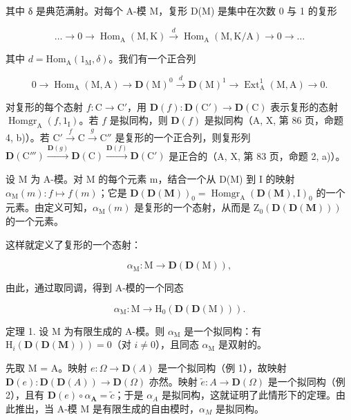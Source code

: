 其中 δ 是典范满射。对每个 A-模 M，复形 D(M) 是集中在次数 0 与 1 的复形

\[
\dots \longrightarrow 0 \longrightarrow \operatorname{Hom} _ {\mathrm{A}} (\mathrm{M}, \mathrm{K}) \stackrel {d} {\longrightarrow} \operatorname{Hom} _ {\mathrm{A}} (\mathrm{M}, \mathrm{K} / \mathrm{A}) \longrightarrow 0 \longrightarrow \dots
\]

其中 \(d = \mathrm{Hom}_{\mathrm{A}}(1_{\mathrm{M}},\delta)\)。我们有一个正合列

\[
0 \to \operatorname{Hom} _ {\mathrm{A}} (\mathrm{M}, \mathrm{A}) \longrightarrow \mathbf {D} (\mathrm{M}) ^ {0} \stackrel {d} {\longrightarrow} \mathbf {D} (\mathrm{M}) ^ {1} \longrightarrow \operatorname{Ext} _ {\mathrm{A}} ^ {1} (\mathrm{M}, \mathrm{A}) \to 0.
\]

对复形的每个态射 \(f: \mathrm{C} \to \mathrm{C}'\)，用 \(\mathbf{D}(f): \mathbf{D}(\mathrm{C}') \to \mathbf{D}(\mathrm{C})\) 表示复形的态射 \(\operatorname{Homgr}_{\mathrm{A}}(f, 1_{\mathrm{I}})\)。若 \(f\) 是拟同构，则 \(\mathbf{D}(f)\) 是拟同构（A, X, 第 86 页，命题 4, b)）。若 \(\mathrm{C}' \xrightarrow{f} \mathrm{C} \xrightarrow{g} \mathrm{C}''\) 是复形的一个正合列，则复形列 \(\mathbf{D}(\mathrm{C}''') \xrightarrow{\mathbf{D}(g)} \mathbf{D}(\mathrm{C}) \xrightarrow{\mathbf{D}(f)} \mathbf{D}(\mathrm{C}')\) 是正合的（A, X, 第 83 页，命题 2, a)）。

设 M 为 A-模。对 M 的每个元素 m，结合一个从 D(M) 到 I 的映射 \(\alpha_{\mathrm{M}}(m): f \mapsto f(m)\)；它是 \(\mathbf{D}(\mathbf{D}(\mathbf{M}))_{0} = \operatorname{Homgr}_{\mathrm{A}}(\mathbf{D}(\mathbf{M}), \mathrm{I})_{0}\) 的一个元素。由定义可知，\(\alpha_{\mathrm{M}}(m)\) 是复形的一个态射，从而是 \(\mathrm{Z}_{0}(\mathbf{D}(\mathbf{D}(\mathbf{M})))\) 的一个元素。

这样就定义了复形的一个态射：

\[
\alpha_ {\mathrm{M}}: \mathrm{M} \rightarrow \mathbf {D} (\mathbf {D} (\mathrm{M})) ,
\]

由此，通过取同调，得到 A-模的一个同态

\[
\alpha_ {\mathrm{M}}: \mathrm{M} \to \mathrm{H} _ {0} (\mathbf {D} (\mathbf {D} (\mathrm{M}))).
\]

定理 1. 设 M 为有限生成的 A-模。则 \(\alpha_{\mathrm{M}}\) 是一个拟同构：有 \(\mathrm{H}_{i}(\mathbf{D}(\mathbf{D}(\mathbf{M}))) = 0\)（对 \(i \neq 0\)），且同态 \(\alpha_{\mathrm{M}}\) 是双射的。

先取 M = A。映射 \(e : \Omega \to \mathbf{D}(A)\) 是一个拟同构（例 1），故映射 \(\mathbf{D}(e) : \mathbf{D}(\mathbf{D}(A)) \to \mathbf{D}(\Omega)\) 亦然。映射 \(\tilde{e} : A \to \mathbf{D}(\Omega)\) 是一个拟同构（例 2），且有 \(\mathbf{D}(e) \circ \alpha_{\mathbf{A}} = \tilde{c}\)；于是 \(\alpha_{A}\) 是拟同构，这就证明了此情形下的定理。由此推出，当 A-模 M 是有限生成的自由模时，\(\alpha_{M}\) 是拟同构。

